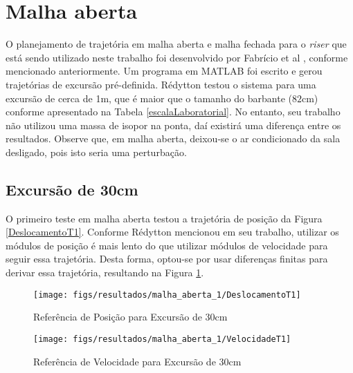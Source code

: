 \section{Malha aberta}

O planejamento de trajetória em malha aberta e malha fechada para o \textit{riser} que está sendo utilizado neste trabalho foi desenvolvido por Fabrício et al \cite{fabricioIFAC}, conforme mencionado anteriormente. Um programa em MATLAB foi escrito e gerou trajetórias de excursão pré-definida. Rédytton \cite{redytton} testou o sistema para uma excursão de cerca de 1m, que é maior que o tamanho do barbante ($82\mathrm{cm}$) conforme apresentado na Tabela \ref{escalaLaboratorial}. No entanto, seu trabalho não utilizou uma massa de isopor na ponta, daí existirá uma diferença entre os resultados. Observe que, em malha aberta, deixou-se o ar condicionado da sala desligado, pois isto seria uma perturbação.

\subsection{Excursão de 30cm}
O primeiro teste em malha aberta testou a trajetória de posição da Figura \ref{DeslocamentoT1}. Conforme Rédytton \cite{redytton} mencionou em seu trabalho, utilizar os módulos de posição é mais lento do que utilizar módulos de velocidade para seguir essa trajetória. Desta forma, optou-se por usar diferenças finitas para derivar essa trajetória, resultando na Figura \ref{VelocidadeT1}. 

\begin{figure}[!htb]
    \centering
    \begin{minipage}{.45\textwidth}
        \centering
        \texttt{[image: figs/resultados/malha\_aberta\_1/DeslocamentoT1]}
        \caption{Referência de Posição para Excursão de 30cm}
        \label{DeslocamentoT1}
    \end{minipage}%
    \hspace{0.1cm}
    \begin{minipage}{0.45\textwidth}
        \centering
        \texttt{[image: figs/resultados/malha\_aberta\_1/VelocidadeT1]}
        \caption{Referência de Velocidade para Excursão de 30cm}
        \label{VelocidadeT1}
    \end{minipage}
\end{figure}

